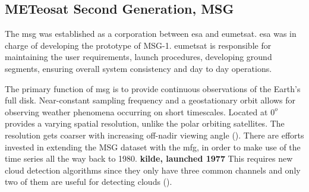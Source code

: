 
\subsection{METeosat Second Generation, MSG} \label{sec:meteosat}
The \acrfull{msg} was established as a corporation between \acrfull{esa} and \acrfull{eumetsat}. \acrshort{esa} was in charge of developing the prototype of MSG-1. \acrshort{eumetsat} is responsible for maintaining the user requirements, launch procedures, developing ground segments, ensuring overall system consistency and day to day operations. 

The primary function of \acrshort{msg} is to provide continuous observations of the Earth's full disk. Near-constant sampling frequency and a geostationary orbit allows for observing weather phenomena occurring on short timescales. Located at $0^o$  provides a varying spatial resolution, unlike the polar orbiting satellites. The resolution gets coarser with increasing off-nadir viewing angle (\cite{Stubenrauch2013AssessmentPanel}). There are efforts invested in extending the MSG dataset with the \acrfull{mfg}, in order to make use of the time series all the way back to 1980. \textbf{kilde, launched 1977} This requires new cloud detection algorithms since they only have three common channels and only two of them are useful for detecting clouds (\cite{Stockli2019CloudApplications}). 

